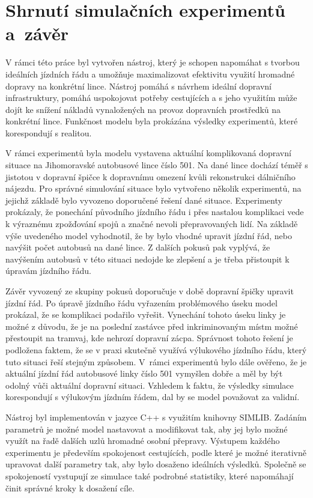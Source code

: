 \documentclass[a4paper]{article}
\begin{document}
\newpage
    \section{Shrnutí simulačních experimentů a~závěr}
    \label{sec:summary}
    		V rámci této práce byl vytvořen nástroj, který je schopen napomáhat s tvorbou ideálních jízdních řádu a umožňuje maximalizovat efektivitu využití hromadné dopravy na konkrétní lince. Nástroj pomáhá s návrhem ideální dopravní infrastruktury, pomáhá uspokojovat potřeby cestujících a s jeho využitím může dojít ke snížení nákladů vynaložených na provoz dopravních prostředků na konkrétní lince. Funkčnost modelu byla prokázána výsledky experimentů, které korespondují s realitou.
  
    
    		V rámci experimentů byla modelu vystavena aktuální komplikovaná dopravní situace na Jihomoravské autobusové lince číslo 501. Na dané lince dochází téměř s jistotou v dopravní špičce k dopravnímu omezení kvůli rekonstrukci dálničního nájezdu. Pro správné simulování situace bylo vytvořeno několik experimentů, na jejichž základě bylo vyvozeno doporučené řešení dané situace.
            Experimenty prokázaly, že ponechání původního jízdního řádu i přes nastalou komplikaci vede k výraznému zpožďování spojů a značné nevoli přepravovaných lidí. Na základě výše uvedeného model vyhodnotil, že by bylo vhodné upravit jízdní řád, nebo navýšit počet autobusů na dané lince. Z dalších pokusů pak vyplývá, že navýšením autobusů v této situaci nedojde ke zlepšení a je třeba přistoupit k úpravám jízdního řádu.
            
            Závěr vyvozený ze skupiny pokusů doporučuje v době dopravní špičky upravit jízdní řád. Po úpravě jízdního řádu vyřazením problémového úseku model prokázal, že se komplikaci podařilo vyřešit. Vynechání tohoto úseku linky je možné z důvodu, že je na poslední zastávce před inkriminovaným místm možné přestoupit na tramvaj, kde nehrozí dopravní zácpa. Správnost tohoto řešení je podložena faktem, že se v praxi skutečně využívá výlukového jízdního řádu, který tuto situaci řeší stejným způsobem. V~rámci experimentů bylo dále ověřeno, že je aktuální jízdní řád autobusové linky číslo 501 vymyšlen dobře a měl by být odolný vůči aktuální dopravní situaci. Vzhledem k faktu, že výsledky simulace korespondují s výlukovým jízdním řádem, dal by se model považovat za validní.

 
     		Nástroj byl implementován v jazyce C++ s využitím knihovny SIMLIB. Zadáním parametrů je možné model nastavovat a modifikovat tak, aby jej bylo možné využít na řadě dalších uzlů hromadné osobní přepravy. Výstupem každého experimentu je především spokojenost cestujících, podle které je možné iterativně upravovat další parametry tak, aby bylo dosaženo ideálních výsledků. Společně se spokojeností vystupují ze simulace také podrobné statistiky, které napomáhají činit správné kroky k dosažení cíle.
			
\end{document}
